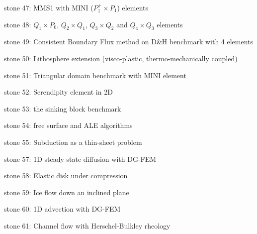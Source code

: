 {\noindent stone 47: MMS1 with MINI ($P_1^+\times P_1$) elements


\noindent stone 48: $Q_1\times P_0$, $Q_2\times Q_1$, $Q_3\times Q_2$ and $Q_4\times Q_3$ elements


\noindent stone 49: Consistent Boundary Flux method on D\&H benchmark with 4 elements 


\noindent stone 50: Lithosphere extension (visco-plastic, thermo-mechanically coupled)


\noindent stone 51: Triangular domain benchmark with MINI element


\noindent stone 52: Serendipity element in 2D 


\noindent stone 53: the sinking block benchmark  


\noindent stone 54: free surface and ALE algorithms


\noindent stone 55: Subduction as a thin-sheet problem


\noindent stone 57: 1D steady state diffusion with DG-FEM


\noindent stone 58: Elastic disk under compression


\noindent stone 59: Ice flow down an inclined plane 


\noindent stone 60: 1D advection with DG-FEM 


\noindent stone 61: Channel flow with Herschel-Bulkley rheology 


}
